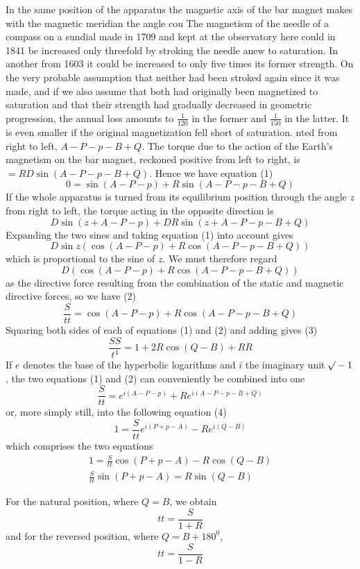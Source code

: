 In the same position of the apparatus the magnetic axis of the bar magnet makes with the magnetic meridian the angle cou%
\expandafter\def\csname HistoricalNoteText416\endcsname{The magnetism of the needle of a compass on a sundial made in 1709 and kept at the observatory here could in 1841 be increased only threefold by stroking the needle anew to saturation. In another from 1603 it could be increased to only five times its former strength. On the very probable assumption that neither had been stroked again since it was made, and if we also assume that both had originally been magnetized to saturation and that their strength had gradually decreased in geometric progression, the annual loss amounts to $\frac{1}{120}$ in the former and $\frac{1}{150}$ in the latter. It is even smaller if the original magnetization fell short of saturation.}%
nted from right to left, $A-P-p-B+Q$. The torque due to the action of the Earth’s magnetism on the bar magnet, reckoned positive from left to right, is $=RD\sin(A-P-p-B+Q)$. Hence we have equation (1)
\[
0=\sin(A-P-p)+R\sin(A-P-p-B+Q)
\]
If the whole apparatus is turned from its equilibrium position through the angle $z$ from right to left, the torque acting in the opposite direction is
\[
D\sin(z+A-P-p)+DR\sin(z+A-P-p-B+Q)
\]
Expanding the two sines and taking equation (1) into account gives
\[
D\sin z(\cos(A-P-p)+R\cos(A-P-p-B+Q))
\]
which is proportional to the sine of $z$. We must therefore regard
\[
D(\cos(A-P-p)+R\cos(A-P-p-B+Q))
\]
as the directive force resulting from the combination of the static and magnetic directive forces, so we have (2)
\[
\frac{S}{tt}=\cos(A-P-p)+R\cos(A-P-p-B+Q)
\]
Squaring both sides of each of equations (1) and (2) and adding gives (3)
\[
\frac{SS}{t^4}=1+2R\cos(Q-B)+RR
\]
If $e$ denotes the base of the hyperbolic logarithms and $i$ the imaginary unit $\mathord{{}^{}\!\surd}-1$, the two equations (1) and (2) can conveniently be combined into one
\[
\frac{S}{tt}=e^{i(A-P-p)}+Re^{i(A-P-p-B+Q)}
\]
or, more simply still, into the following equation (4)
\[
1=\frac{S}{tt}e^{i(P+p-A)}-Re^{i(Q-B)}
\]
which comprises the two equations
\[
\begin{gathered}
1=\frac{S}{tt}\cos(P+p-A)-R\cos(Q-B)\\
\frac{S}{tt}\sin(P+p-A)=R\sin(Q-B)
\end{gathered}
\]

For the natural position, where $Q=B$, we obtain
\[
tt=\frac{S}{1+R}
\]
and for the reversed position, where $Q=B+180^0$,
\[
tt=\frac{S}{1-R}
\]

